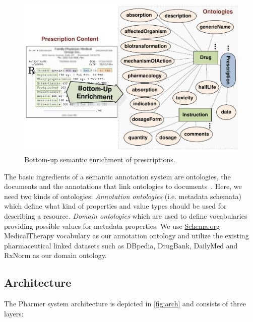 \documentclass[conference]{IEEEtran}
\begin{document}
\begin{figure}[tb]
	\centering
		\includegraphics[width=1.0\columnwidth]{images/approaches.pdf}
	\caption{Bottom-up semantic enrichment of prescriptions.}
	\label{fig:botup}
\end{figure}

The basic ingredients of a semantic annotation system are ontologies, the documents and the annotations that link ontologies to documents~\cite{khalili2012}.
Here, we need two kinds of ontologies:
\emph{Annotation ontologies} (i.e. metadata schemata) which define what kind of properties and value types should be used for describing a resource.
\emph{Domain ontologies} which are used to define vocabularies providing possible values for metadata properties.
We use \url{Schema.org} MedicalTherapy vocabulary as our annotation ontology and utilize the existing pharmaceutical linked datasets such as DBpedia, DrugBank, DailyMed and RxNorm as our domain ontology.


\subsection{Architecture}

The Pharmer system architecture is depicted in \autoref{fig:arch} and consists of three layers:
\end{document}

